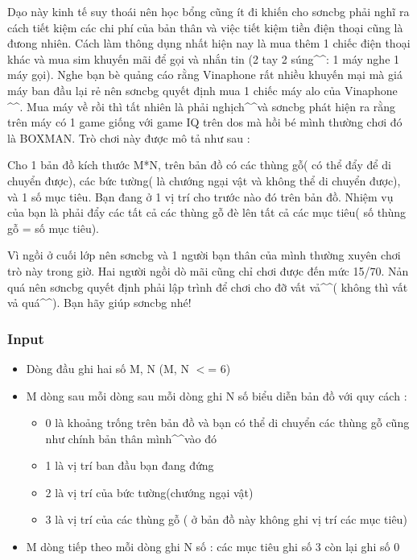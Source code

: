

Dạo này kinh tế suy thoái nên học bổng cũng ít đi khiến cho sơncbg phải nghĩ ra cách tiết kiệm các chi phí của bản thân và việc tiết kiệm tiền điện thoại cũng là đưong nhiên. Cách làm thông dụng nhất hiện nay là mua thêm 1 chiếc điện thoại khác và mua sim khuyến mãi để gọi và nhắn tin (2 tay 2 súng\textasciicircum\textasciicircum : 1 máy nghe 1 máy gọi). Nghe bạn bè quảng cáo rằng Vinaphone rất nhiều khuyến mại mà giá máy ban đầu lại rẻ nên sơncbg quyết định mua 1 chiếc máy alo của Vinaphone \textasciicircum\textasciicircum. Mua máy về rồi thì tất nhiên là phải nghịch\textasciicircum\textasciicircum và sơncbg phát hiện ra rằng trên máy có 1 game giống với game IQ trên dos mà hồi bé mình thường chơi đó là BOXMAN. Trò chơi này được mô tả như sau :

Cho 1 bản đồ kích thước M*N, trên bản đồ có các thùng gỗ( có thể đẩy để di chuyển được), các bức tường( là chướng ngại vật và không thể di chuyển được), và 1 số mục tiêu. Bạn đang ở 1 vị trí cho trước nào đó trên bản đồ. Nhiệm vụ của bạn là phải đẩy các tất cả các thùng gỗ đè lên tất cả các mục tiêu( số thùng gỗ = số mục tiêu).

Vì ngồi ở cuối lớp nên sơncbg và 1 người bạn thân của mình thường xuyên chơi trò này trong giờ. Hai người ngồi dò mãi cũng chỉ chơi được đến mức 15/70. Nản quá nên sơncbg quyết định phải lập trình để chơi cho đỡ vất vả\textasciicircum\textasciicircum( không thì vất vả quá\textasciicircum\textasciicircum). Bạn hãy giúp sơncbg nhé!

\subsubsection{Input}
\begin{itemize}
	\item Dòng đầu ghi hai số M, N (M, N $<$= 6)
	\item M dòng sau mỗi dòng sau mỗi dòng ghi N số biểu diễn bản đồ với quy cách :
\begin{itemize}
	\item 0 là khoảng trống trên bản đồ và bạn có thể di chuyển các thùng gỗ cũng như chính bản thân mình\textasciicircum\textasciicircum vào đó
	\item 1 là vị trí ban đầu bạn đang đứng
	\item 2 là vị trí của bức tường(chướng ngại vật)
	\item 3 là vị trí của các thùng gỗ ( ở bản đồ này không ghi vị trí các mục tiêu)
\end{itemize}
	\item M dòng tiếp theo mỗi dòng ghi N số : các mục tiêu ghi số 3 còn lại ghi số 0
\end{itemize}

